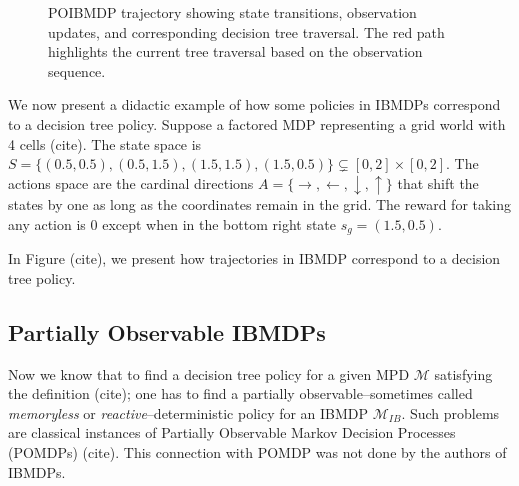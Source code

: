 \begin{figure}[h]
\caption{POIBMDP trajectory showing state transitions, observation updates, and corresponding decision tree traversal. The red path highlights the current tree traversal based on the observation sequence.}
\label{fig:poibmdp_trajectory}
\end{figure}

We now present a didactic example of how some policies in IBMDPs correspond to a decision tree policy. 
Suppose a factored MDP representing a grid world with 4 cells (cite). The state space is $S = \{(0.5, 0.5), (0.5, 1.5), (1.5, 1.5), (1.5, 0.5)\}\subsetneq [0, 2] \times [0, 2]$.
The actions space are the cardinal directions $A = \{\rightarrow, \leftarrow, \downarrow, \uparrow\}$ that shift the states by one as long as the coordinates remain in the grid.
The reward for taking any action is 0 except when in the bottom right state $s_g = (1.5, 0.5)$. 

In Figure (cite), we present how trajectories in IBMDP correspond to a decision tree policy.

\subsection{Partially Observable IBMDPs}

Now we know that to find a decision tree policy for a given MPD $\mathcal{M}$ satisfying the definition (cite); one has to find a partially observable--sometimes called \textit{memoryless} or \textit{reactive}--deterministic policy for an IBMDP $\mathcal{M}_{IB}$.
Such problems are classical instances of Partially Observable Markov Decision Processes (POMDPs) (cite). This connection with POMDP was not done by the authors of IBMDPs. 

